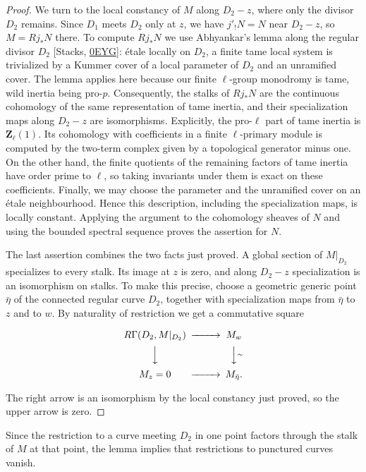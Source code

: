 \documentclass[11pt]{article}
\begin{document}
\begin{proof}[{Proof}]
We turn to the local constancy of \(M\) along \(D_2-z\), where only the divisor \(D_2\) remains. Since \(D_1\) meets \(D_2\) only at \(z\), we have \(j'_!N=N\) near \(D_2-z\), so \(M=Rj_*N\) there. To compute \(Rj_*N\) we use Abhyankar's lemma along the regular divisor \(D_2\) [Stacks, \href{https://stacks.math.columbia.edu/tag/0EYG}{0EYG}]: étale locally on \(D_2\), a finite tame local system is trivialized by a Kummer cover of a local parameter of \(D_2\) and an unramified cover. The lemma applies here because our finite \(\ell\)-group monodromy is tame, wild inertia being pro-\(p\). Consequently, the stalks of \(Rj_*N\) are the continuous cohomology of the same representation of tame inertia, and their specialization maps along \(D_2-z\) are isomorphisms. Explicitly, the pro-\(\ell\) part of tame inertia is \(\mathbf Z_\ell(1)\). Its cohomology with coefficients in a finite \(\ell\)-primary module is computed by the two-term complex given by a topological generator minus one. On the other hand, the finite quotients of the remaining factors of tame inertia have order prime to \(\ell\), so taking invariants under them is exact on these coefficients. Finally, we may choose the parameter and the unramified cover on an étale neighbourhood. Hence this description, including the specialization maps, is locally constant. Applying the argument to the cohomology sheaves of \(N\) and using the bounded spectral sequence proves the assertion for \(N\).

The last assertion combines the two facts just proved. A global section of \(M|_{D_2}\) specializes to every stalk. Its image at \(z\) is zero, and along \(D_2-z\) specialization is an isomorphism on stalks. To make this precise, choose a geometric generic point \(\bar\eta\) of the connected regular curve \(D_2\), together with specialization maps from \(\bar\eta\) to \(z\) and to \(w\). By naturality of restriction we get a commutative square

\[
\begin{CD}
R\Gamma(D_2,M|_{D_2}) @>>> M_w\\
@VVV @VV{\sim}V\\
M_z=0 @>>> M_{\bar\eta}.
\end{CD}
\]

The right arrow is an isomorphism by the local constancy just proved, so the upper arrow is zero.
\end{proof}

\label{bp30}%
Since the restriction to a curve meeting \(D_2\) in one point factors through the stalk of \(M\) at that point, the lemma implies that restrictions to punctured curves vanish.
\end{document}
